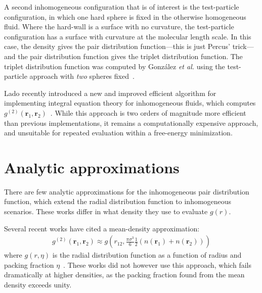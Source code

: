 \documentclass[letterpaper,twocolumn,amsmath,amssymb,pre,aps,10pt]{revtex4-1}
\newcommand{\rr}{\textbf{r}}
\begin{document}
A second inhomogeneous configuration that is of interest is the
test-particle configuration, in which one hard sphere is fixed in the
otherwise homogeneous fluid.  Where the hard-wall is a surface with no
curvature, the test-particle configuration has a surface with
curvature at the molecular length scale.  In this case, the density
gives the pair distribution function---this is just Percus'
trick---and the pair distribution function gives the triplet
distribution function.  The triplet distribution function was computed
by Gonz\'alez \emph{et al.} using the test-particle approach with
\emph{two} spheres fixed~\cite{gonzalez1999test}.

Lado recently introduced a new and improved efficient algorithm for
implementing integral equation theory for inhomogeneous fluids, which
computes $g^{(2)}(\rr_1,\rr_2)$~\cite{lado2009efficient}.  While this
approach is two orders of magnitude more efficient than previous
implementations, it remains a computationally expensive approach, and
unsuitable for repeated evaluation within a free-energy minimization.

\section{Analytic approximations}
There are few analytic approximations for the inhomogeneous pair
distribution function, which extend the radial distribution function
to inhomogeneous scenarios.  These works differ in what density they
use to evaluate $g(r)$.

Several recent works have cited a
mean-density approximation:
\begin{align}
  g^{(2)}(\rr_1,\rr_2) \approx g\left(r_{12}, \frac{\pi\sigma^3}{6}\tfrac12
  (n(\rr_1)+n(\rr_2))\right)
\end{align}
where $g(r,\eta)$ is the radial distribution function as a function of
radius and packing fraction $\eta$~\cite{gloor2007prediction,
  gross2009density}.  These works did not however use this approach,
which fails dramatically at higher densities, as the packing fraction
found from the mean density exceeds unity.
\end{document}
